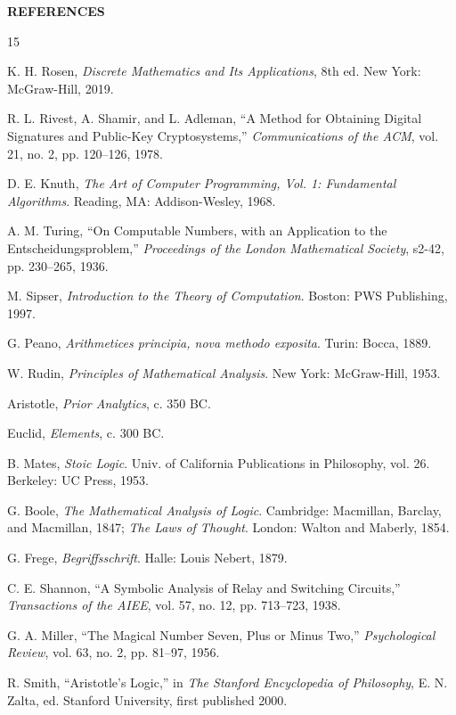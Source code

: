 \documentclass[11pt,a4paper]{article}
\begin{document}
\begingroup
\renewcommand{\section}[2]{}%
\begin{center}
{\bfseries REFERENCES}
\end{center}
\vspace{-0.8em}
\small
\begin{thebibliography}{15}
\setlength{\itemsep}{0.1em}

 K. H. Rosen, \textit{Discrete Mathematics and Its Applications}, 8th ed. New York: McGraw-Hill, 2019.

 R. L. Rivest, A. Shamir, and L. Adleman, ``A Method for Obtaining Digital Signatures and Public-Key
Cryptosystems,'' \textit{Communications of the ACM}, vol. 21, no. 2, pp. 120--126, 1978.

 D. E. Knuth, \textit{The Art of Computer Programming, Vol. 1: Fundamental Algorithms}. Reading, MA:
Addison-Wesley, 1968.

 A. M. Turing, ``On Computable Numbers, with an Application to the Entscheidungsproblem,''
\textit{Proceedings of the London Mathematical Society}, s2-42, pp. 230--265, 1936.

 M. Sipser, \textit{Introduction to the Theory of Computation}. Boston: PWS Publishing, 1997.

 G. Peano, \textit{Arithmetices principia, nova methodo exposita}. Turin: Bocca, 1889.

 W. Rudin, \textit{Principles of Mathematical Analysis}. New York: McGraw-Hill, 1953.

 Aristotle, \textit{Prior Analytics}, c. 350 BC.

 Euclid, \textit{Elements}, c. 300 BC.

 B. Mates, \textit{Stoic Logic}. Univ. of California Publications in Philosophy, vol. 26. Berkeley: UC Press,
1953.

 G. Boole, \textit{The Mathematical Analysis of Logic}. Cambridge: Macmillan, Barclay, and Macmillan, 1847;
\textit{The Laws of Thought}. London: Walton and Maberly, 1854.

 G. Frege, \textit{Begriffsschrift}. Halle: Louis Nebert, 1879.

 C. E. Shannon, ``A Symbolic Analysis of Relay and Switching Circuits,'' \textit{Transactions of the AIEE}, vol.
57, no. 12, pp. 713--723, 1938.

 G. A. Miller, ``The Magical Number Seven, Plus or Minus Two,'' \textit{Psychological Review}, vol. 63, no. 2,
pp. 81--97, 1956.

 R. Smith, ``Aristotle's Logic,'' in \textit{The Stanford Encyclopedia of Philosophy}, E. N. Zalta, ed. Stanford
University, first published 2000.

\end{thebibliography}
\endgroup
\end{document}

